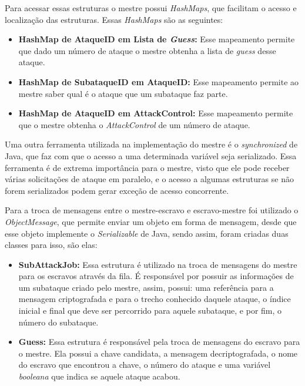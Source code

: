 \documentclass[
	12pt,				%
    oneside,			%
	a4paper,			%
	english,			%
	brazil,				%
	]{abntex2}
\begin{document}
Para acessar essas estruturas o mestre possui \textit{HashMaps}, que facilitam o acesso e localização das estruturas. 
Essas \textit{HashMaps} são as seguintes:

\begin{itemize}

	\item \textbf{HashMap de AtaqueID em Lista de \textit{Guess}:} Esse mapeamento permite que dado um número de ataque o
	mestre obtenha a lista de \textit{guess} desse ataque.
	
	\item \textbf{HashMap de SubataqueID em AtaqueID:} Esse mapeamento permite ao mestre saber qual é o ataque que um 
	subataque faz parte.
	
	\item \textbf{HashMap de AtaqueID em AttackControl:} Esse mapeamento permite que o mestre obtenha o
	\textit{AttackControl} de um número de ataque.
	
\end{itemize}

Uma outra ferramenta utilizada na implementação do mestre é o \textit{synchronized} de Java, que faz com que o acesso
a uma determinada variável seja serializado. Essa ferramenta é de extrema importância para o mestre, visto que ele pode
receber várias solicitações de ataque em paralelo, e o acesso a algumas estruturas se não forem serializados podem gerar
exceção de acesso concorrente.

Para a troca de mensagens entre o mestre-escravo e escravo-mestre foi utilizado o \textit{ObjectMessage}, que permite enviar um objeto em forma de mensagem, desde que esse objeto implemente o \textit{Serializable} de Java, sendo assim, foram criadas duas classes para isso, são elas:

\begin{itemize}

	\item \textbf{SubAttackJob:} Essa estrutura é utilizado na troca de mensagens do mestre para os escravos através da fila.
	É responsável por possuir as informações de um subataque criado pelo mestre, assim, possui: uma referência para a
	mensagem criptografada e para o trecho conhecido daquele ataque, o índice inicial e final que deve ser percorrido para
	aquele subataque, e por fim, o número do subataque.
		
	\item \textbf{Guess:} Essa estrutura é responsável pela troca de mensagens do escravo para o mestre.
	Ela possui a chave candidata, a mensagem decriptografada, o nome do escravo que encontrou a chave, o número do ataque e 
	uma variável \textit{booleana} que indica se aquele ataque acabou.
		
\end{itemize}
\end{document}
